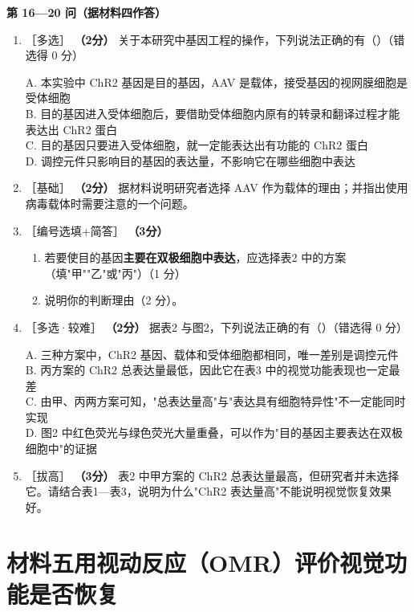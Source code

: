 \documentclass[UTF8,a4paper,11pt]{ctexart}
\newcommand{\pt}[1]{\textbf{（#1分）}}
\newcommand{\lv}[1]{{\small\color{deepgreen}［#1］}}
\newcommand{\tian}[1]{\underline{\hspace{#1}}}
\newcommand{\choice}[1]{\par\smallskip\noindent #1\par}
\begin{document}
\begin{qbox}
\noindent\textbf{\color{deepgreen}第 16—20 问（据材料四作答）}
\begin{enumerate}[leftmargin=2.2em,itemsep=5pt,start=16]
\item \lv{多选} \pt{2} 关于本研究中基因工程的操作，下列说法正确的有（\quad）（错选得 0 分）
\choice{A. 本实验中 ChR2 基因是目的基因，AAV 是载体，接受基因的视网膜细胞是受体细胞\\
B. 目的基因进入受体细胞后，要借助受体细胞内原有的转录和翻译过程才能表达出 ChR2 蛋白\\
C. 目的基因只要进入受体细胞，就一定能表达出有功能的 ChR2 蛋白\\
D. 调控元件只影响目的基因的表达量，不影响它在哪些细胞中表达}

\item \lv{基础} \pt{2} 据材料说明研究者选择 AAV 作为载体的理由；并指出使用病毒载体时需要注意的一个问题。\tian{0.48\textwidth}

\item \lv{编号选填+简答} \pt{3}
\begin{enumerate}[label=(\arabic*),leftmargin=1.4em,itemsep=2pt]
\item 若要使目的基因\textbf{主要在双极细胞中表达}，应选择表2 中的方案\tian{0.8cm}（填"甲""乙"或"丙"）（1 分）
\item 说明你的判断理由（2 分）。
\end{enumerate}

\item \lv{多选·较难} \pt{2} 据表2 与图2，下列说法正确的有（\quad）（错选得 0 分）
\choice{A. 三种方案中，ChR2 基因、载体和受体细胞都相同，唯一差别是调控元件\\
B. 丙方案的 ChR2 总表达量最低，因此它在表3 中的视觉功能表现也一定最差\\
C. 由甲、丙两方案可知，"总表达量高"与"表达具有细胞特异性"不一定能同时实现\\
D. 图2 中红色荧光与绿色荧光大量重叠，可以作为"目的基因主要表达在双极细胞中"的证据}

\item \lv{拔高} \pt{3} 表2 中甲方案的 ChR2 总表达量最高，但研究者并未选择它。请结合表1—表3，说明为什么"ChR2 表达量高"不能说明视觉恢复效果好。
\end{enumerate}
\end{qbox}

\section{材料五\quad 用视动反应（OMR）评价视觉功能是否恢复}
\end{document}
